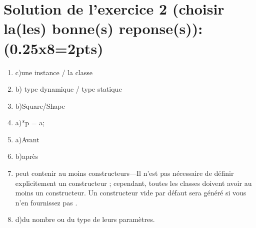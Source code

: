\section*{Solution de l'exercice 2 \scriptsize{(choisir la(les) bonne(s) reponse(s)):(0.25x8=2pts)}}

\begin{enumerate}
    \item c)une instance / la classe
    \item b) type dynamique / type statique
    \item b)Square/Shape
    \item a)*p = a;
    \item a)Avant
    \item b)après
    \item {peut contenir au moins constructeurs---Il n'est pas nécessaire de définir explicitement un constructeur ; cependant, toutes les classes doivent avoir au moins un constructeur. Un constructeur vide par défaut sera généré si vous n'en fournissez pas .}
    \item d)du nombre ou du type de leurs paramètres.
\end{enumerate}

